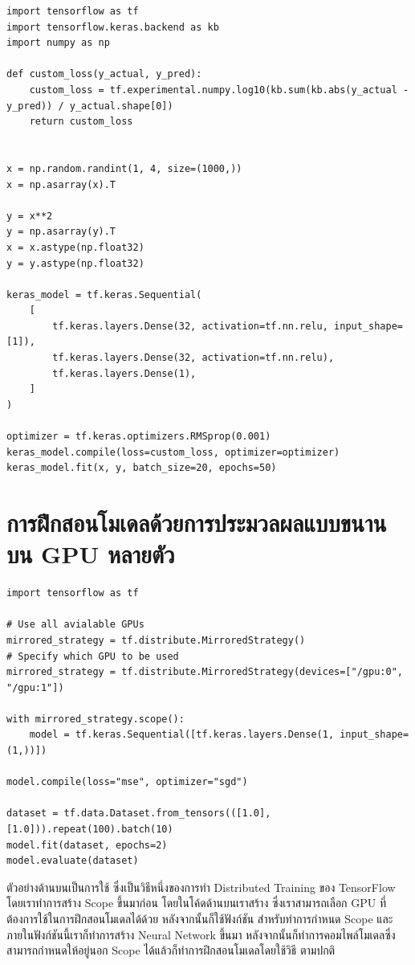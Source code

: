 \begin{lstlisting}[style=MyPython]
import tensorflow as tf
import tensorflow.keras.backend as kb
import numpy as np

def custom_loss(y_actual, y_pred):
    custom_loss = tf.experimental.numpy.log10(kb.sum(kb.abs(y_actual - y_pred)) / y_actual.shape[0])
    return custom_loss


x = np.random.randint(1, 4, size=(1000,))
x = np.asarray(x).T

y = x**2
y = np.asarray(y).T
x = x.astype(np.float32)
y = y.astype(np.float32)

keras_model = tf.keras.Sequential(
    [
        tf.keras.layers.Dense(32, activation=tf.nn.relu, input_shape=[1]),
        tf.keras.layers.Dense(32, activation=tf.nn.relu),
        tf.keras.layers.Dense(1),
    ]
)

optimizer = tf.keras.optimizers.RMSprop(0.001)
keras_model.compile(loss=custom_loss, optimizer=optimizer)
keras_model.fit(x, y, batch_size=20, epochs=50)
\end{lstlisting}

\section{การฝึกสอนโมเดลด้วยการประมวลผลแบบขนานบน GPU หลายตัว}
\label{sec:tf_multi_gpu}

\begin{lstlisting}[style=MyPython]
import tensorflow as tf

# Use all avialable GPUs
mirrored_strategy = tf.distribute.MirroredStrategy()
# Specify which GPU to be used
mirrored_strategy = tf.distribute.MirroredStrategy(devices=["/gpu:0", "/gpu:1"])

with mirrored_strategy.scope():
    model = tf.keras.Sequential([tf.keras.layers.Dense(1, input_shape=(1,))])

model.compile(loss="mse", optimizer="sgd")

dataset = tf.data.Dataset.from_tensors(([1.0], [1.0])).repeat(100).batch(10)
model.fit(dataset, epochs=2)
model.evaluate(dataset)
\end{lstlisting}

\vspace{1em}

ตัวอย่างด้านบนเป็นการใช้  ซึ่งเป็นวิธีหนึ่งของการทำ Distributed Training ของ TensorFlow โดยเราทำการสร้าง Scope ขึ้นมาก่อน โดยในโค้ดด้านบนเราสร้าง  ซึ่งเราสามารถเลือก GPU ที่ต้องการใช้ในการฝึกสอนโมเดลได้ด้วย หลังจากนั้นก็ใช้ฟังก์ชัน  สำหรับทำการกำหนด Scope และภายในฟังก์ชันนี้เราก็ทำการสร้าง Neural Network ขึ้นมา หลังจากนั้นก็ทำการคอมไพล์โมเดลซึ่งสามารถกำหนดให้อยู่นอก Scope ได้แล้วก็ทำการฝึกสอนโมเดลโดยใช้วิธี  ตามปกติ
